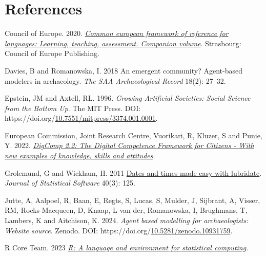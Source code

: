 \documentclass[
]{article}
\newlength{\cslhangindent}
\newlength{\cslentryspacingunit} %
\newenvironment{CSLReferences}[2] %
 {%
  \setlength{\parindent}{0pt}
  \ifodd #1
  \let\oldpar\par
  \def\par{\hangindent=\cslhangindent\oldpar}
  \fi
  \setlength{\parskip}{#2\cslentryspacingunit}
 }%
 {}
\begin{document}
\hypertarget{references}{%
\section*{References}\label{references}}

\hypertarget{refs}{}
\begin{CSLReferences}{1}{0}
\leavevmode{}%
Council of Europe. 2020. \emph{\href{http://www.coe.int/lang-cefr}{Common european framework of reference for languages: Learning, teaching, assessment. Companion volume}}. Strasbourg: Council of Europe Publishing.

\leavevmode{}%
Davies, B and Romanowska, I. 2018 An emergent community? Agent-based modelers in archaeology. \emph{The SAA Archaeological Record} 18(2): 27--32.

\leavevmode{}%
Epstein, JM and Axtell, RL. 1996. \emph{Growing Artificial Societies: Social Science from the Bottom Up}. The MIT Press. DOI: https://doi.org/\href{https://doi.org/10.7551/mitpress/3374.001.0001}{10.7551/mitpress/3374.001.0001}.

\leavevmode{}%
European Commission, Joint Research Centre, Vuorikari, R, Kluzer, S and Punie, Y. 2022. \emph{\href{https://data.europa.eu/doi/10.2760/115376}{DigComp 2.2: The Digital Competence Framework for Citizens - With new examples of knowledge, skills and attitudes}}.

\leavevmode{}%
Grolemund, G and Wickham, H. 2011 \href{https://www.jstatsoft.org/v40/i03/}{Dates and times made easy with lubridate}. \emph{Journal of Statistical Software} 40(3): 125.

\leavevmode{}%
Jutte, A, Aalpoel, R, Baan, E, Regts, S, Lucas, S, Mulder, J, Sijbrant, A, Visser, RM, Rocks-Macqueen, D, Knaap, L van der, Romanowska, I, Brughmans, T, Lambers, K and Aitchison, K. 2024. \emph{Agent based modelling for archaeologists: Website source}. Zenodo. DOI: https://doi.org/\href{https://doi.org/10.5281/zenodo.10931759}{10.5281/zenodo.10931759}.

\leavevmode{}%
R Core Team. 2023 \emph{\href{https://www.R-project.org/}{R: A language and environment for statistical computing}}.


\end{CSLReferences}
\end{document}
